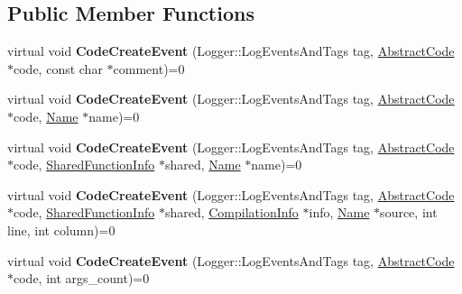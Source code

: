 \subsection*{Public Member Functions}
\begin{DoxyCompactItemize}
\item 
virtual void {\bfseries Code\+Create\+Event} (Logger\+::\+Log\+Events\+And\+Tags tag, \hyperlink{classv8_1_1internal_1_1_abstract_code}{Abstract\+Code} $\ast$code, const char $\ast$comment)=0\hypertarget{classv8_1_1internal_1_1_code_event_listener_ac5d81904079b2b36f398288b1b6b2a0e}{}\label{classv8_1_1internal_1_1_code_event_listener_ac5d81904079b2b36f398288b1b6b2a0e}

\item 
virtual void {\bfseries Code\+Create\+Event} (Logger\+::\+Log\+Events\+And\+Tags tag, \hyperlink{classv8_1_1internal_1_1_abstract_code}{Abstract\+Code} $\ast$code, \hyperlink{classv8_1_1internal_1_1_name}{Name} $\ast$name)=0\hypertarget{classv8_1_1internal_1_1_code_event_listener_a3685faa8e1c4a65ab1f7cf1bd82eed3a}{}\label{classv8_1_1internal_1_1_code_event_listener_a3685faa8e1c4a65ab1f7cf1bd82eed3a}

\item 
virtual void {\bfseries Code\+Create\+Event} (Logger\+::\+Log\+Events\+And\+Tags tag, \hyperlink{classv8_1_1internal_1_1_abstract_code}{Abstract\+Code} $\ast$code, \hyperlink{classv8_1_1internal_1_1_shared_function_info}{Shared\+Function\+Info} $\ast$shared, \hyperlink{classv8_1_1internal_1_1_name}{Name} $\ast$name)=0\hypertarget{classv8_1_1internal_1_1_code_event_listener_a8f785ecf94c5d9eef42f9d713c8891a4}{}\label{classv8_1_1internal_1_1_code_event_listener_a8f785ecf94c5d9eef42f9d713c8891a4}

\item 
virtual void {\bfseries Code\+Create\+Event} (Logger\+::\+Log\+Events\+And\+Tags tag, \hyperlink{classv8_1_1internal_1_1_abstract_code}{Abstract\+Code} $\ast$code, \hyperlink{classv8_1_1internal_1_1_shared_function_info}{Shared\+Function\+Info} $\ast$shared, \hyperlink{classv8_1_1internal_1_1_compilation_info}{Compilation\+Info} $\ast$info, \hyperlink{classv8_1_1internal_1_1_name}{Name} $\ast$source, int line, int column)=0\hypertarget{classv8_1_1internal_1_1_code_event_listener_a9c3a11e21c45d1fc6b3596b8dcaabf3e}{}\label{classv8_1_1internal_1_1_code_event_listener_a9c3a11e21c45d1fc6b3596b8dcaabf3e}

\item 
virtual void {\bfseries Code\+Create\+Event} (Logger\+::\+Log\+Events\+And\+Tags tag, \hyperlink{classv8_1_1internal_1_1_abstract_code}{Abstract\+Code} $\ast$code, int args\+\_\+count)=0\hypertarget{classv8_1_1internal_1_1_code_event_listener_a1fa98884858547396cd0ffcf4f5638e7}{}\label{classv8_1_1internal_1_1_code_event_listener_a1fa98884858547396cd0ffcf4f5638e7}


\end{DoxyCompactItemize}
